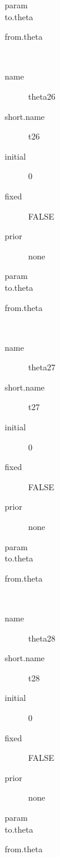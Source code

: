 \begin{description}
\begin{description}
\begin{description}
	 	 	 \item[ param ]  
	 	 	 \item[ to.theta ] \verb|| 
	 	 	 \item[ from.theta ] \verb|| 
	 	 \end{description}
	 	\item[theta26]\ 
	 	 \begin{description}
	 	 	 \item[ name ] theta26 
	 	 	 \item[ short.name ] t26 
	 	 	 \item[ initial ] 0 
	 	 	 \item[ fixed ] FALSE 
	 	 	 \item[ prior ] none 
	 	 	 \item[ param ]  
	 	 	 \item[ to.theta ] \verb|| 
	 	 	 \item[ from.theta ] \verb|| 
	 	 \end{description}
	 	\item[theta27]\ 
	 	 \begin{description}
	 	 	 \item[ name ] theta27 
	 	 	 \item[ short.name ] t27 
	 	 	 \item[ initial ] 0 
	 	 	 \item[ fixed ] FALSE 
	 	 	 \item[ prior ] none 
	 	 	 \item[ param ]  
	 	 	 \item[ to.theta ] \verb|| 
	 	 	 \item[ from.theta ] \verb|| 
	 	 \end{description}
	 	\item[theta28]\ 
	 	 \begin{description}
	 	 	 \item[ name ] theta28 
	 	 	 \item[ short.name ] t28 
	 	 	 \item[ initial ] 0 
	 	 	 \item[ fixed ] FALSE 
	 	 	 \item[ prior ] none 
	 	 	 \item[ param ]  
	 	 	 \item[ to.theta ] \verb|| 
	 	 	 \item[ from.theta ] \verb|| 
	 	 \end{description}
	 	\item[theta29]\ 
	 	 \begin{description}

\end{description}
\end{description}
\end{description}
